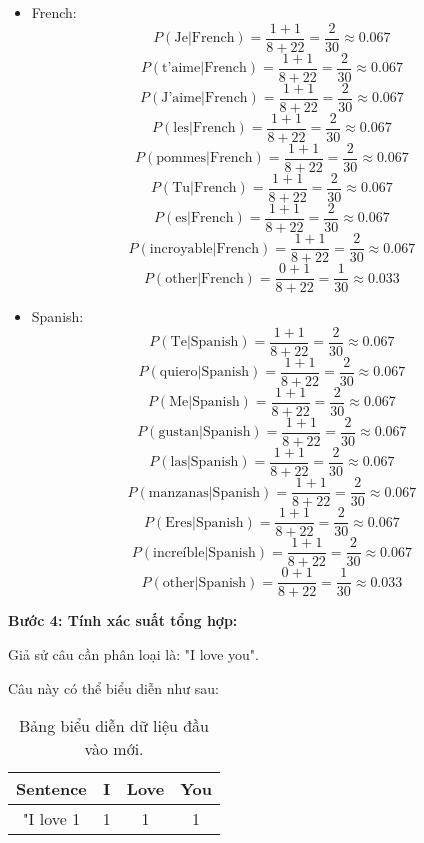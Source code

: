 \begin{enumerate}
\begin{itemize}
        \item French:
  \[
  P(\text{Je} | \text{French}) = \frac{1+1}{8+22} = \frac{2}{30} \approx 0.067
  \]
  \[
  P(\text{t'aime} | \text{French}) = \frac{1+1}{8+22} = \frac{2}{30} \approx 0.067
  \]
  \[
  P(\text{J'aime} | \text{French}) = \frac{1+1}{8+22} = \frac{2}{30} \approx 0.067
  \]
  \[
  P(\text{les} | \text{French}) = \frac{1+1}{8+22} = \frac{2}{30} \approx 0.067
  \]
  \[
  P(\text{pommes} | \text{French}) = \frac{1+1}{8+22} = \frac{2}{30} \approx 0.067
  \]
  \[
  P(\text{Tu} | \text{French}) = \frac{1+1}{8+22} = \frac{2}{30} \approx 0.067
  \]
  \[
  P(\text{es} | \text{French}) = \frac{1+1}{8+22} = \frac{2}{30} \approx 0.067
  \]
  \[
  P(\text{incroyable} | \text{French}) = \frac{1+1}{8+22} = \frac{2}{30} \approx 0.067
  \]
  \[
  P(\text{other} | \text{French}) = \frac{0+1}{8+22} = \frac{1}{30} \approx 0.033
  \]

        \item Spanish:
  \[
  P(\text{Te} | \text{Spanish}) = \frac{1+1}{8+22} = \frac{2}{30} \approx 0.067
  \]
  \[
  P(\text{quiero} | \text{Spanish}) = \frac{1+1}{8+22} = \frac{2}{30} \approx 0.067
  \]
  \[
  P(\text{Me} | \text{Spanish}) = \frac{1+1}{8+22} = \frac{2}{30} \approx 0.067
  \]
  \[
  P(\text{gustan} | \text{Spanish}) = \frac{1+1}{8+22} = \frac{2}{30} \approx 0.067
  \]
  \[
  P(\text{las} | \text{Spanish}) = \frac{1+1}{8+22} = \frac{2}{30} \approx 0.067
  \]
  \[
  P(\text{manzanas} | \text{Spanish}) = \frac{1+1}{8+22} = \frac{2}{30} \approx 0.067
  \]
  \[
  P(\text{Eres} | \text{Spanish}) = \frac{1+1}{8+22} = \frac{2}{30} \approx 0.067
  \]
  \[
  P(\text{increíble} | \text{Spanish}) = \frac{1+1}{8+22} = \frac{2}{30} \approx 0.067
  \]
  \[
  P(\text{other} | \text{Spanish}) = \frac{0+1}{8+22} = \frac{1}{30} \approx 0.033
  \]
    \end{itemize}

\end{enumerate}


\textbf{Bước 4: Tính xác suất tổng hợp:}

Giả sử câu cần phân loại là: "I love you".

Câu này có thể biểu diễn như sau:

\begin{table}[H]
\centering
\begin{tabular}{|c|c|c|c|}
\hline
\textbf{Sentence} & \textbf{I} & \textbf{Love} & \textbf{You} \\
\hline
"I love  1 & 1 & 1 & 1 \\
\hline
\end{tabular}
\caption{Bảng biểu diễn dữ liệu đầu vào mới.}
\end{table}

